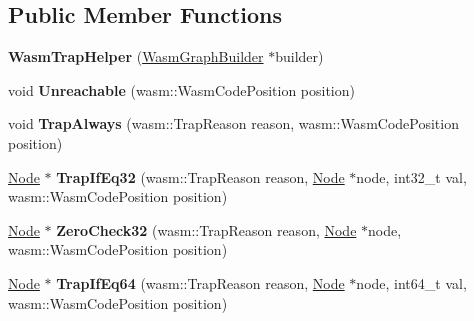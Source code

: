 \subsection*{Public Member Functions}
\begin{DoxyCompactItemize}
\item 
{\bfseries Wasm\+Trap\+Helper} (\hyperlink{classv8_1_1internal_1_1compiler_1_1_wasm_graph_builder}{Wasm\+Graph\+Builder} $\ast$builder)\hypertarget{classv8_1_1internal_1_1compiler_1_1_wasm_trap_helper_a498e4b1e329de840f5ce203ef1e66834}{}\label{classv8_1_1internal_1_1compiler_1_1_wasm_trap_helper_a498e4b1e329de840f5ce203ef1e66834}

\item 
void {\bfseries Unreachable} (wasm\+::\+Wasm\+Code\+Position position)\hypertarget{classv8_1_1internal_1_1compiler_1_1_wasm_trap_helper_ab1c8c4c7c6e3fa65aee6ef22354249e2}{}\label{classv8_1_1internal_1_1compiler_1_1_wasm_trap_helper_ab1c8c4c7c6e3fa65aee6ef22354249e2}

\item 
void {\bfseries Trap\+Always} (wasm\+::\+Trap\+Reason reason, wasm\+::\+Wasm\+Code\+Position position)\hypertarget{classv8_1_1internal_1_1compiler_1_1_wasm_trap_helper_a0575d15bd691b02852af7c910aa525b6}{}\label{classv8_1_1internal_1_1compiler_1_1_wasm_trap_helper_a0575d15bd691b02852af7c910aa525b6}

\item 
\hyperlink{classv8_1_1internal_1_1compiler_1_1_node}{Node} $\ast$ {\bfseries Trap\+If\+Eq32} (wasm\+::\+Trap\+Reason reason, \hyperlink{classv8_1_1internal_1_1compiler_1_1_node}{Node} $\ast$node, int32\+\_\+t val, wasm\+::\+Wasm\+Code\+Position position)\hypertarget{classv8_1_1internal_1_1compiler_1_1_wasm_trap_helper_abaa9d21259aa16bcbaa6ea8c1c67a28f}{}\label{classv8_1_1internal_1_1compiler_1_1_wasm_trap_helper_abaa9d21259aa16bcbaa6ea8c1c67a28f}

\item 
\hyperlink{classv8_1_1internal_1_1compiler_1_1_node}{Node} $\ast$ {\bfseries Zero\+Check32} (wasm\+::\+Trap\+Reason reason, \hyperlink{classv8_1_1internal_1_1compiler_1_1_node}{Node} $\ast$node, wasm\+::\+Wasm\+Code\+Position position)\hypertarget{classv8_1_1internal_1_1compiler_1_1_wasm_trap_helper_ab02bdaef58a53b21b523b0b90d073f0f}{}\label{classv8_1_1internal_1_1compiler_1_1_wasm_trap_helper_ab02bdaef58a53b21b523b0b90d073f0f}

\item 
\hyperlink{classv8_1_1internal_1_1compiler_1_1_node}{Node} $\ast$ {\bfseries Trap\+If\+Eq64} (wasm\+::\+Trap\+Reason reason, \hyperlink{classv8_1_1internal_1_1compiler_1_1_node}{Node} $\ast$node, int64\+\_\+t val, wasm\+::\+Wasm\+Code\+Position position)\hypertarget{classv8_1_1internal_1_1compiler_1_1_wasm_trap_helper_a7ef5c232e57810762dd46ea1eb428e4b}{}\label{classv8_1_1internal_1_1compiler_1_1_wasm_trap_helper_a7ef5c232e57810762dd46ea1eb428e4b}


\end{DoxyCompactItemize}
